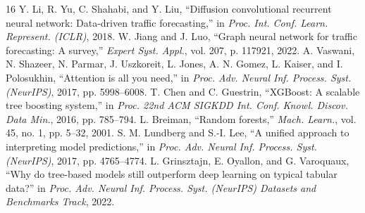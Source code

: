 \documentclass[conference]{IEEEtran}
\begin{document}
\begin{thebibliography}{16}
 Y. Li, R. Yu, C. Shahabi, and Y. Liu, ``Diffusion convolutional recurrent neural network: Data-driven traffic forecasting,'' in \textit{Proc. Int. Conf. Learn. Represent. (ICLR)}, 2018.
 W. Jiang and J. Luo, ``Graph neural network for traffic forecasting: A survey,'' \textit{Expert Syst. Appl.}, vol. 207, p. 117921, 2022.
 A. Vaswani, N. Shazeer, N. Parmar, J. Uszkoreit, L. Jones, A. N. Gomez, L. Kaiser, and I. Polosukhin, ``Attention is all you need,'' in \textit{Proc. Adv. Neural Inf. Process. Syst. (NeurIPS)}, 2017, pp. 5998--6008.
 T. Chen and C. Guestrin, ``XGBoost: A scalable tree boosting system,'' in \textit{Proc. 22nd ACM SIGKDD Int. Conf. Knowl. Discov. Data Min.}, 2016, pp. 785--794.
 L. Breiman, ``Random forests,'' \textit{Mach. Learn.}, vol. 45, no. 1, pp. 5--32, 2001.
 S. M. Lundberg and S.-I. Lee, ``A unified approach to interpreting model predictions,'' in \textit{Proc. Adv. Neural Inf. Process. Syst. (NeurIPS)}, 2017, pp. 4765--4774.
 L. Grinsztajn, E. Oyallon, and G. Varoquaux, ``Why do tree-based models still outperform deep learning on typical tabular data?'' in \textit{Proc. Adv. Neural Inf. Process. Syst. (NeurIPS) Datasets and Benchmarks Track}, 2022.
\end{thebibliography}
\end{document}
